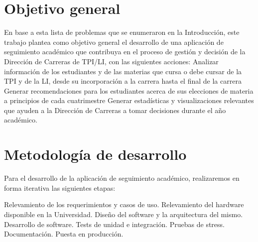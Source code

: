 \section[Objetivo general]{Objetivo general}
En base a esta lista de problemas que se enumeraron en la Introducción, este trabajo plantea como objetivo general el desarrollo de una aplicación de seguimiento académico que contribuya en el proceso de gestión y decisión de la Dirección de Carreras de TPI/LI, con las siguientes acciones:
Analizar información de los estudiantes y de las materias que cursa o debe cursar de la TPI y de la LI, desde su incorporación a la carrera hasta el final de la carrera    
Generar recomendaciones para los estudiantes acerca de sus elecciones de materia a principios de cada cuatrimestre
Generar estadísticas y visualizaciones relevantes que ayuden a la Dirección de Carreras a tomar decisiones durante el año académico.

\section[Metodología de desarrollo]{Metodología de desarrollo}
Para el desarrollo de la aplicación de seguimiento académico, realizaremos en forma iterativa las siguientes etapas:

\begin{outline}
    \1 Relevamiento de los requerimientos y casos de uso.
    \1 Relevamiento del hardware disponible en la Universidad.
    \1 Diseño del software y la arquitectura del mismo.
    \1 Desarrollo de software.
    \1 Tests de unidad e integración.
    \1 Pruebas de stress.
    \1 Documentación.
    \1 Puesta en producción.
\end{outline}